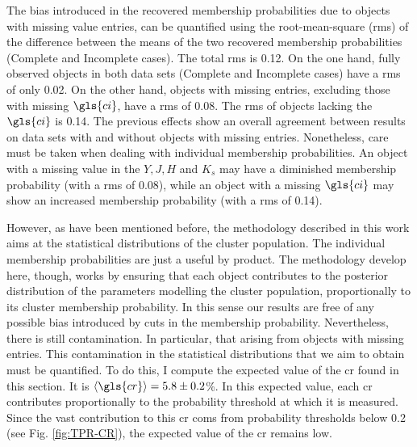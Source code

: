 The bias introduced in the recovered membership probabilities due to objects with missing value entries, can be quantified using the root-mean-square (rms) of the difference between the means of the two recovered membership probabilities (Complete and Incomplete cases). The total rms is 0.12. On the one hand, fully observed objects in both data sets (Complete and Incomplete cases) have a rms of only 0.02. On the other hand, objects with missing entries, excluding those with missing $\gls{ci}$, have a rms of 0.08. The rms of objects lacking the $\gls{ci}$ is 0.14. The previous effects show an overall agreement between results on data sets with and without objects with missing entries. Nonetheless, care must be taken when dealing with individual membership probabilities. An object with a missing value in the $Y,J,H$ and $K_s$ may have a diminished membership probability (with a rms of 0.08), while an object with a missing $\gls{ci}$ may show an increased membership probability (with a rms of 0.14).  


However, as have been mentioned before, the methodology described in this work aims at the statistical distributions of the cluster population. The individual membership probabilities are just a useful by product. The methodology develop here, though, works by ensuring that each object contributes to the posterior distribution of the parameters modelling the cluster population, proportionally to its cluster membership probability. In this sense our results are free of any possible bias introduced by cuts in the membership probability. Nevertheless, there is still contamination. In particular, that arising from objects with missing entries. This contamination in the statistical distributions that we aim to obtain must be quantified. To do this, I compute the expected value of the \gls{cr} found in this section. It is $\langle \gls{cr} \rangle=5.8\pm 0.2$\%. In this expected value, each \gls{cr} contributes proportionally to the probability threshold at which it is measured. Since the vast contribution to this \gls{cr} coms from probability thresholds below 0.2 (see Fig. \ref{fig:TPR-CR}), the expected value of the \gls{cr} remains low. 

